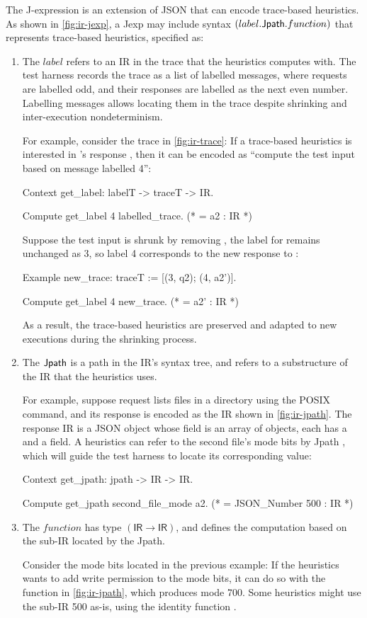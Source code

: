 The J-expression is an extension of JSON that can encode trace-based heuristics.
As shown in \autoref{fig:ir-jexp}, a Jexp may include syntax
$(label.\mathsf{Jpath}.function)$ that represents trace-based heuristics, specified as:
\begin{enumerate}
\item The $label$ refers to an IR in the trace that the heuristics computes
  with.  The test harness records the trace as a list of labelled messages,
  where requests are labelled odd, and their responses are labelled as the next
  even number.  Labelling messages allows locating them in the trace despite
  shrinking and inter-execution nondeterminism.

  For example, consider the trace in \autoref{fig:ir-trace}: If a trace-based
  heuristics is interested in 's response , then it can be
  encoded as ``compute the test input based on message labelled 4'':
\begin{coq}
  Context get_label: labelT -> traceT -> IR.

  Compute get_label 4 labelled_trace.
  (* = a2 : IR *)
\end{coq}
  
  Suppose the test input is shrunk by removing , the label for 
  remains unchanged as 3, so label 4 corresponds to the new response to
  :
\begin{coq}
  Example new_trace: traceT :=
    [(3, q2); (4, a2')].

  Compute get_label 4 new_trace.
  (* = a2' : IR *)
\end{coq}

As a result, the trace-based heuristics are preserved and adapted to new
executions during the shrinking process.
\item The $\mathsf{Jpath}$ is a path in the IR's syntax tree, and refers to a
  substructure of the IR that the heuristics uses.

  For example, suppose request  lists files in a directory using the
  POSIX  command, and its response  is encoded as the IR
  shown in \autoref{fig:ir-jpath}.  The response IR is a JSON object whose
   field is an array of objects, each has a 
  and a  field.  A heuristics can refer to the second file's
  mode bits by Jpath , which will guide the test
  harness to locate its corresponding value:
\begin{coq}
  Context get_jpath: jpath -> IR -> IR.

  Compute get_jpath second_file_mode a2.
  (* = JSON_Number 500 : IR *)
\end{coq}
\item The $function$ has type $(\mathsf{IR}\to\mathsf{IR})$, and defines the
  computation based on the sub-IR located by the Jpath.

  Consider the mode bits located in the previous example: If the heuristics
  wants to add write permission to the mode bits, it can do so with the
   function in \autoref{fig:ir-jpath}, which produces mode
  700.  Some heuristics might use the sub-IR 500 as-is, using the identity
  function .
\end{enumerate}

